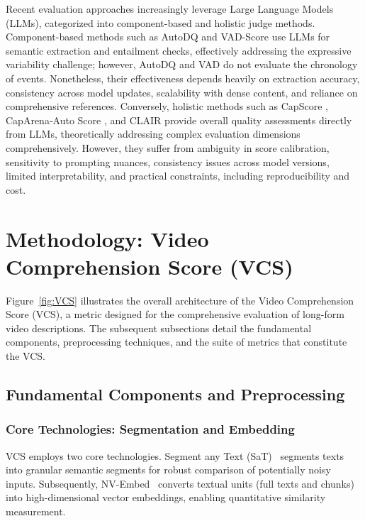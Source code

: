 \documentclass[letterpaper]{article} %
\begin{document}
Recent evaluation approaches increasingly leverage Large Language Models (LLMs), categorized into component-based and holistic judge methods. Component-based methods such as AutoDQ \citep{wyzs:24} and VAD-Score \citep{dp:25} use LLMs for semantic extraction and entailment checks, effectively addressing the expressive variability challenge; however, AutoDQ and VAD do not evaluate the chronology of events. Nonetheless, their effectiveness depends heavily on extraction accuracy, consistency across model updates, scalability with dense content, and reliance on comprehensive references. Conversely, holistic methods such as CapScore \citep{li:24}, CapArena‑Auto Score \citep{cheng:25}, and CLAIR \citep{chan:23} provide overall quality assessments directly from LLMs, theoretically addressing complex evaluation dimensions comprehensively. However, they suffer from ambiguity in score calibration, sensitivity to prompting nuances, consistency issues across model versions, limited interpretability, and practical constraints, including reproducibility and cost.

\section{Methodology: Video Comprehension Score (VCS)}
\label{sec:methodology_vcs}

Figure~\ref{fig:VCS} illustrates the overall architecture of the Video Comprehension Score (VCS), a metric designed for the comprehensive evaluation of long-form video descriptions. The subsequent subsections detail the fundamental components, preprocessing techniques, and the suite of metrics that constitute the VCS.

\subsection{Fundamental Components and Preprocessing}
\label{sec:fundamental_components_revised}

\subsubsection{Core Technologies: Segmentation and Embedding}
\label{ssec:core_technologies_revised}
VCS employs two core technologies. Segment any Text (SaT)~\cite{frohmann2024segment} segments texts into granular semantic segments for robust comparison of potentially noisy inputs. Subsequently, NV-Embed~\cite{lee2024nv} converts textual units (full texts and chunks) into high-dimensional vector embeddings, enabling quantitative similarity measurement.
\end{document}
